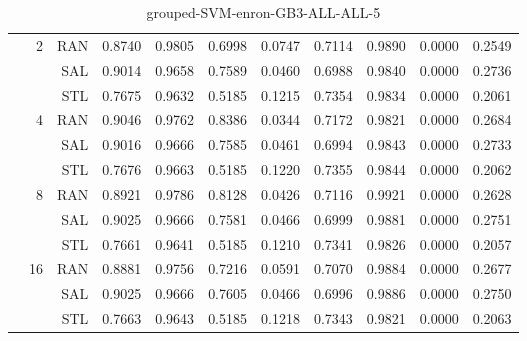 \begin{center}
\begin{table}[htbp]
\begin{center}
\begin{tabular}{ | r | r | r | r | r | r | r | r | r | r | r |}
 & \multirow{3}{*}{2} & RAN & 0.8740 & 0.9805 & 0.6998 & 0.0747 & 0.7114 & 0.9890 & 0.0000 & 0.2549\\ \cline{3-11}
 &   & SAL & 0.9014 & 0.9658 & 0.7589 & 0.0460 & 0.6988 & 0.9840 & 0.0000 & 0.2736\\ \cline{3-11}
 &   & STL & 0.7675 & 0.9632 & 0.5185 & 0.1215 & 0.7354 & 0.9834 & 0.0000 & 0.2061\\ \cline{2-11}
 & \multirow{3}{*}{4} & RAN & 0.9046 & 0.9762 & 0.8386 & 0.0344 & 0.7172 & 0.9821 & 0.0000 & 0.2684\\ \cline{3-11}
 &   & SAL & 0.9016 & 0.9666 & 0.7585 & 0.0461 & 0.6994 & 0.9843 & 0.0000 & 0.2733\\ \cline{3-11}
 &   & STL & 0.7676 & 0.9663 & 0.5185 & 0.1220 & 0.7355 & 0.9844 & 0.0000 & 0.2062\\ \cline{2-11}
 & \multirow{3}{*}{8} & RAN & 0.8921 & 0.9786 & 0.8128 & 0.0426 & 0.7116 & 0.9921 & 0.0000 & 0.2628\\ \cline{3-11}
 &   & SAL & 0.9025 & 0.9666 & 0.7581 & 0.0466 & 0.6999 & 0.9881 & 0.0000 & 0.2751\\ \cline{3-11}
 &   & STL & 0.7661 & 0.9641 & 0.5185 & 0.1210 & 0.7341 & 0.9826 & 0.0000 & 0.2057\\ \cline{2-11}
 & \multirow{3}{*}{16} & RAN & 0.8881 & 0.9756 & 0.7216 & 0.0591 & 0.7070 & 0.9884 & 0.0000 & 0.2677\\ \cline{3-11}
 &   & SAL & 0.9025 & 0.9666 & 0.7605 & 0.0466 & 0.6996 & 0.9886 & 0.0000 & 0.2750\\ \cline{3-11}
 &   & STL & 0.7663 & 0.9643 & 0.5185 & 0.1218 & 0.7343 & 0.9821 & 0.0000 & 0.2063\\ \cline{2-11}
\hline
\end{tabular}
\caption{grouped-SVM-enron-GB3-ALL-ALL-5}
\end{center}
 \end{table}
\end{center}

